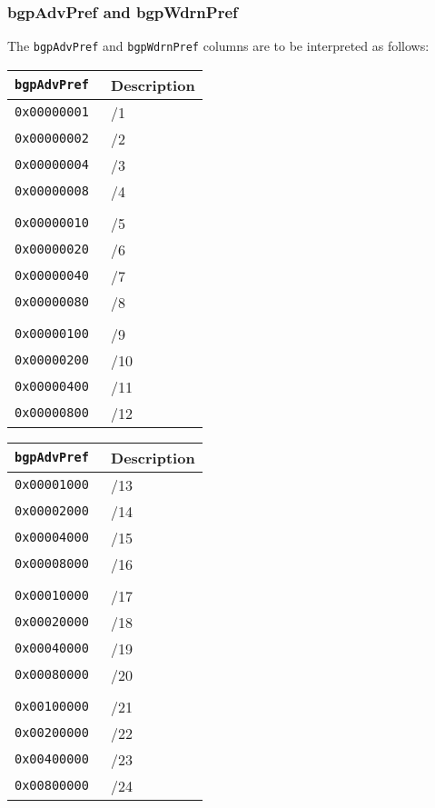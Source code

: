 \documentclass[documentation]{subfiles}
\begin{document}
\subsubsection{bgpAdvPref and bgpWdrnPref}\label{bgpPrefMask}
The {\tt bgpAdvPref} and {\tt bgpWdrnPref} columns are to be interpreted as follows:\\
\begin{minipage}{0.3\textwidth}
    \begin{longtable}{>{\tt}rl}
        \toprule
        {\bf bgpAdvPref} & {\bf Description}\\
        \midrule\endhead%
        0x00000001 & /1 \\
        0x00000002 & /2 \\
        0x00000004 & /3 \\
        0x00000008 & /4 \\
        \\
        0x00000010 & /5 \\
        0x00000020 & /6 \\
        0x00000040 & /7 \\
        0x00000080 & /8 \\
        \\
        0x00000100 & /9 \\
        0x00000200 & /10 \\
        0x00000400 & /11 \\
        0x00000800 & /12 \\
        \bottomrule
    \end{longtable}
\end{minipage}
\begin{minipage}{0.3\textwidth}
    \begin{longtable}{>{\tt}rl}
        \toprule
        {\bf bgpAdvPref} & {\bf Description}\\
        \midrule\endhead%
        0x00001000 & /13 \\
        0x00002000 & /14 \\
        0x00004000 & /15 \\
        0x00008000 & /16 \\
        \\
        0x00010000 & /17 \\
        0x00020000 & /18 \\
        0x00040000 & /19 \\
        0x00080000 & /20 \\
        \\
        0x00100000 & /21 \\
        0x00200000 & /22 \\
        0x00400000 & /23 \\
        0x00800000 & /24 \\
        \bottomrule
    \end{longtable}
\end{minipage}
\end{document}
